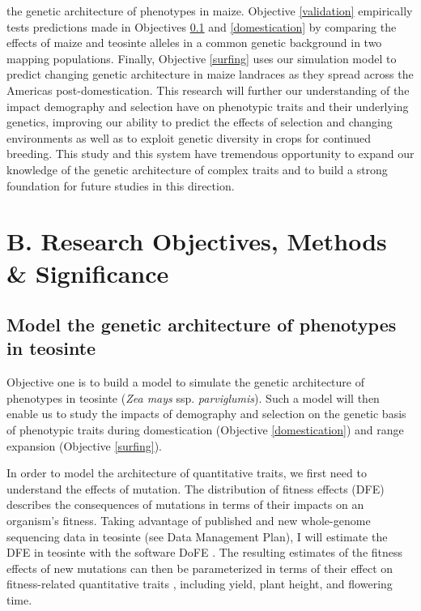 the genetic architecture of phenotypes in maize.  Objective \ref{validation} empirically tests  predictions made in Objectives \ref{modeling} and \ref{domestication} by comparing the effects of maize and teosinte alleles in a common genetic background in two mapping populations. Finally, Objective \ref{surfing} uses our simulation model to predict changing genetic architecture in maize landraces as they spread across the Americas post-domestication. This research will further our understanding of the impact demography and selection have on phenotypic traits and their underlying genetics, improving our ability to predict the effects of selection and changing environments as well as to exploit genetic diversity in crops for continued breeding. This study and this system have tremendous opportunity to expand our knowledge of the genetic architecture of complex traits and to build a strong foundation for future studies in this direction.


\section*{B. Research Objectives, Methods \& Significance}

\renewcommand\thesubsection{\Roman {subsection}.}

\subsection{Model the genetic architecture of phenotypes in teosinte}
\label{modeling}
Objective one is to build a model to simulate the genetic architecture of phenotypes in teosinte (\emph{Zea mays} ssp. \emph{parviglumis}). Such a model will then enable us to study the impacts of demography and selection on the genetic basis of phenotypic traits during domestication (Objective \ref{domestication}) and range expansion (Objective \ref{surfing}).

In order to model the architecture of quantitative traits, we first need to understand the effects of mutation. The distribution of fitness effects (DFE) describes the consequences of mutations in terms of their impacts on an organism's fitness. Taking advantage of published \citep{Chia:2012} and new whole-genome sequencing data in teosinte (see Data Management Plan), I will estimate the DFE in teosinte with the software DoFE \citep{Keightley:2007hq, Stoletzki:2011}.%
The resulting estimates of the fitness effects of new mutations can then be parameterized in terms of their effect on fitness-related quantitative traits \citep{Keightley:1988, eyre-walker:2010}, including yield, plant height, and flowering time.

